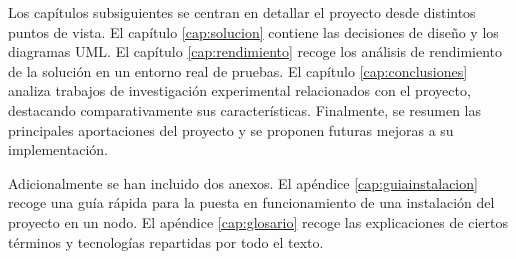 Los cap\'itulos subsiguientes se centran en detallar el proyecto desde distintos puntos de vista. El cap\'itulo \ref{cap:solucion} contiene las decisiones de dise\~no y los diagramas UML. El cap\'itulo \ref{cap:rendimiento} recoge los an\'alisis de rendimiento de la soluci\'on en un entorno real de pruebas. El cap\'itulo \ref{cap:conclusiones} analiza trabajos de investigaci\'on experimental relacionados con el proyecto, destacando comparativamente sus caracter\'isticas.  Finalmente, se resumen las principales aportaciones del proyecto y se proponen futuras mejoras a su implementaci\'on. \newline

Adicionalmente se han incluido dos anexos. El ap\'endice \ref{cap:guiainstalacion} recoge una gu\'ia r\'apida para la puesta en funcionamiento de una instalaci\'on del proyecto en un nodo. El ap\'endice \ref{cap:glosario} recoge las explicaciones de ciertos t\'erminos y tecnolog\'ias repartidas por todo el texto.
